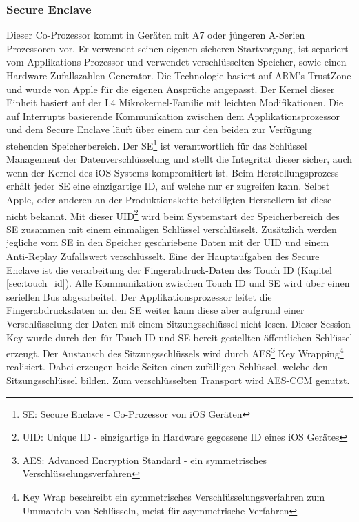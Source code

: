 	\subsubsection{Secure Enclave}\label{sec:secure_enclave}
		Dieser Co-Prozessor kommt in Geräten mit A7 oder jüngeren A-Serien Prozessoren
		vor. Er verwendet seinen eigenen sicheren Startvorgang, ist separiert vom
		Applikations Prozessor und verwendet verschlüsselten Speicher, sowie einen
		Hardware Zufallszahlen Generator. Die Technologie basiert auf ARM's
		TrustZone\cite{TrustZone2015}
		und wurde von Apple für die eigenen Ansprüche angepasst. Der Kernel dieser
		Einheit basiert auf der L4
		Mikrokernel-Familie\cite{L4MicroKernel2015} mit leichten
		Modifikationen. Die auf Interrupts basierende Kommunikation zwischen dem
		Applikationsprozessor und dem Secure Enclave läuft über einem nur den beiden zur Verfügung stehenden Speicherbereich.
		Der SE\footnote{SE: Secure Enclave - Co-Prozessor von iOS Geräten} ist
		verantwortlich für das Schlüssel Management der Datenverschlüsselung und stellt die Integrität dieser sicher, auch wenn der
		Kernel des iOS Systems kompromitiert ist. Beim Herstellungsprozess erhält
		jeder SE eine einzigartige ID, auf welche nur er zugreifen kann. Selbst Apple,
		oder anderen an der Produktionskette beteiligten Herstellern ist diese nicht bekannt.
		Mit dieser UID\footnote{UID: Unique ID - einzigartige in Hardware gegossene ID
		eines iOS Gerätes} wird beim Systemstart der Speicherbereich des SE zusammen mit einem
		einmaligen Schlüssel verschlüsselt.
		Zusätzlich werden jegliche vom SE in den Speicher geschriebene Daten mit der
		UID und einem Anti-Replay Zufallswert verschlüsselt. Eine der Hauptaufgaben
		des Secure Enclave ist die verarbeitung der Fingerabdruck-Daten des Touch ID
		(Kapitel \ref{sec:touch_id}).
		Alle Kommunikation zwischen Touch ID und SE wird über einen seriellen Bus
		abgearbeitet. Der Applikationsprozessor leitet die Fingerabdrucksdaten an den
		SE weiter kann diese aber aufgrund einer Verschlüsselung der Daten mit einem
		Sitzungsschlüssel nicht lesen. Dieser Session Key wurde durch den für Touch
		ID und SE bereit gestellten öffentlichen Schlüssel erzeugt. Der Austausch des
		Sitzungsschlüssels wird durch AES\footnote{AES: Advanced Encryption Standard
		- ein symmetrisches Verschlüsselungsverfahren} Key
		Wrapping\footnote{Key Wrap beschreibt ein symmetrisches
		Verschlüsselungsverfahren zum Ummanteln von Schlüsseln, meist für
		asymmetrische Verfahren} realisiert.
		Dabei erzeugen beide Seiten einen zufälligen Schlüssel, welche den Sitzungsschlüssel bilden.
		Zum verschlüsselten Transport wird AES-CCM genutzt.
